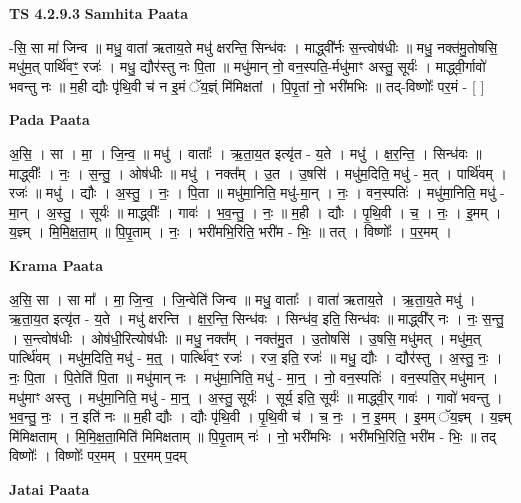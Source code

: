 \documentclass[17pt]{extarticle}
\begin{document}
\textbf{TS 4.2.9.3 } \newline
\textbf{Samhita Paata} \newline

-सि॒ सा मा॑ जिन्व ॥ मधु॒ वाता॑ ऋताय॒ते मधु॑ क्षरन्ति॒ सिन्ध॑वः । माद्ध्वी᳚र्नः स॒न्त्वोष॑धीः ॥ मधु॒ नक्त॑मु॒तोषसि॒ मधु॑म॒त् पार्थि॑वꣳ॒॒ रजः॑ । मधु॒ द्यौर॑स्तु नः पि॒ता ॥ मधु॑मान् नो॒ वन॒स्पति॒-र्मधु॑माꣳ अस्तु॒ सूर्यः॑ । माद्ध्वी॒र्गावो॑ भवन्तु नः ॥ म॒ही द्यौः पृ॑थि॒वी च॑ न इ॒मं ॅय॒ज्ञ्ं मि॑मिक्षतां । पि॒पृ॒तां नो॒ भरी॑मभिः ॥ तद्-विष्णोः᳚ पर॒मं - [  ] \newline

\textbf{Pada Paata} \newline

अ॒सि॒ । सा । मा॒ । जि॒न्व॒ ॥ मधु॑ । वाताः᳚ । ऋ॒ता॒य॒त इत्यृ॑त - य॒ते । मधु॑ । क्ष॒र॒न्ति॒ । सिन्ध॑वः ॥ माद्ध्वीः᳚ । नः॒ । स॒न्तु॒ । ओष॑धीः ॥ मधु॑ । नक्त᳚म् । उ॒त । उ॒षसि॑ । मधु॑म॒दिति॒ मधु॑ - म॒त् । पार्थि॑वम् । रजः॑ ॥ मधु॑ । द्यौः । अ॒स्तु॒ । नः॒ । पि॒ता ॥ मधु॑मा॒निति॒ मधु॑-मा॒न् । नः॒ । वन॒स्पतिः॑ । मधु॑मा॒निति॒ मधु॑ - मा॒न् । अ॒स्तु॒ । सूर्यः॑ ॥ माद्ध्वीः᳚ । गावः॑ । भ॒व॒न्तु॒ । नः॒ ॥ म॒ही । द्यौः । पृ॒थि॒वी । च॒ । नः॒ । इ॒मम् । य॒ज्ञ्म् । मि॒मि॒क्ष॒ता॒म् ॥ पि॒पृ॒ताम् । नः॒ । भरी॑मभि॒रिति॒ भरी॑म - भिः॒ ॥ तत् । विष्णोः᳚ । प॒र॒मम् ।  \newline


\textbf{Krama Paata} \newline

अ॒सि॒ सा । सा मा᳚ । मा॒ जि॒न्व॒ । जि॒न्वेति॑ जिन्व ॥ मधु॒ वाताः᳚ । वाता॑ ऋताय॒ते । ऋ॒ता॒य॒ते मधु॑ । ऋ॒ता॒य॒त इत्यृ॑त - य॒ते । मधु॑ क्षरन्ति । क्ष॒र॒न्ति॒ सिन्ध॑वः । सिन्ध॑व॒ इति॒ सिन्ध॑वः ॥ माद्ध्वी᳚र् नः । नः॒ स॒न्तु॒ । स॒न्त्वोष॑धीः । ओष॑धी॒रित्योष॑धीः ॥ मधु॒ नक्त᳚म् । नक्त॑मु॒त । उ॒तोषसि॑ । उ॒षसि॒ मधु॑मत् । मधु॑म॒त् पार्त्थि॑वम् । मधु॑म॒दिति॒ मधु॑ - म॒त्॒ । पार्त्थि॑वꣳ॒॒ रजः॑ । रज॒ इति॒ रजः॑ ॥ मधु॒ द्यौः । द्यौर॑स्तु । अ॒स्तु॒ नः॒ । नः॒ पि॒ता । पि॒तेति॑ पि॒ता ॥ मधु॑मान् नः । मधु॑मा॒निति॒ मधु॑ - मा॒न्॒ । नो॒ वन॒स्पतिः॑ । वन॒स्पति॒र् मधु॑मान् । मधु॑माꣳ अस्तु । मधु॑मा॒निति॒ मधु॑ - मा॒न्॒ । अ॒स्तु॒ सूर्यः॑ । सूर्य॒ इति॒ सूर्यः॑ ॥ माद्ध्वी॒र् गावः॑ । गावो॑ भवन्तु । भ॒व॒न्तु॒ नः॒ । न॒ इति॑ नः ॥ म॒ही द्यौः । द्यौः पृ॑थि॒वी । पृ॒थि॒वी च॑ । च॒ नः॒ । न॒ इ॒मम् । इ॒मम् ॅय॒ज्ञ्म् । य॒ज्ञ्म् मि॑मिक्षताम् । मि॒मि॒क्ष॒ता॒मिति॑ मिमिक्षताम् ॥ पि॒पृ॒ताम् नः॑ । नो॒ भरी॑मभिः । भरी॑मभि॒रिति॒ भरी॑म - भिः॒ ॥ तद् विष्णोः᳚ । विष्णोः᳚ पर॒मम् । प॒र॒मम् प॒दम् \newline

\textbf{Jatai Paata} \newline
\end{document}
